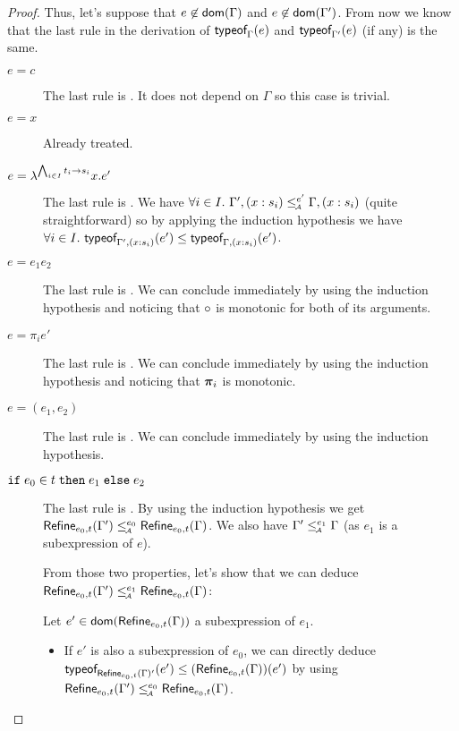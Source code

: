 \documentclass[a4paper]{article}
\theoremstyle{definition}
\begin{document}
\begin{proof}
  Thus, let's suppose that $e\not\in\dom\Gamma$ and $e\not\in\dom{\Gamma'}$.
  From now we know that the last rule in the derivation of $\tyof e {\Gamma}$ and $\tyof e {\Gamma'}$ (if any) is the same.

  \begin{description}
    \item[$e=c$] The last rule is . It does not depend on $\Gamma$ so this case is trivial.
    \item[$e=x$] Already treated.
    \item[$e=\lambda^{\bigwedge_{i\in I} \arrow {t_i}{s_i}}x.e'$]
    The last rule is .
    We have $\forall i\in I.\ \Gamma', (x:s_i) \leqA^{e'} \Gamma, (x:s_i)$ (quite straightforward)
    so by applying the induction hypothesis we have $\forall i\in I.\ \tyof {e'} {\Gamma', (x:s_i)} \leq \tyof {e'} {\Gamma, (x:s_i)}$.

    \item[$e=e_1 e_2$] The last rule is .
    We can conclude immediately by using the induction hypothesis and noticing that $\apply {} {}$ is monotonic for both of its arguments.

    \item[$e=\pi_i e'$] The last rule is .
    We can conclude immediately by using the induction hypothesis and noticing that $\bpi_i$ is monotonic.
     
    \item[$e=(e_1,e_2)$] The last rule is .
    We can conclude immediately by using the induction hypothesis.

    \item[$\ite {e_0} t {e_1} {e_2}$] The last rule is .
    By using the induction hypothesis we get $\Refine {e_0,t} {\Gamma'} \leqA^{e_0} \Refine {e_0,t} \Gamma$.
    We also have $\Gamma' \leqA^{e_1} \Gamma$ (as $e_1$ is a subexpression of $e$).

    From those two properties, let's show that we can deduce $\Refine {e_0,t} {\Gamma'} \leqA^{e_1} \Refine {e_0,t} \Gamma$:

    Let $e'\in\dom{\Refine {e_0,t} \Gamma}$ a subexpression of $e_1$.
    \begin{itemize}
      \item If $e'$ is also a subexpression of $e_0$, we can directly deduce
      $\tyof {e'} {\Refine {e_0,t} \Gamma'} \leq (\Refine {e_0,t} \Gamma) (e')$
      by using $\Refine {e_0,t} {\Gamma'} \leqA^{e_0} \Refine {e_0,t} \Gamma$.


\end{itemize}
\end{description}
\end{proof}
\end{document}
